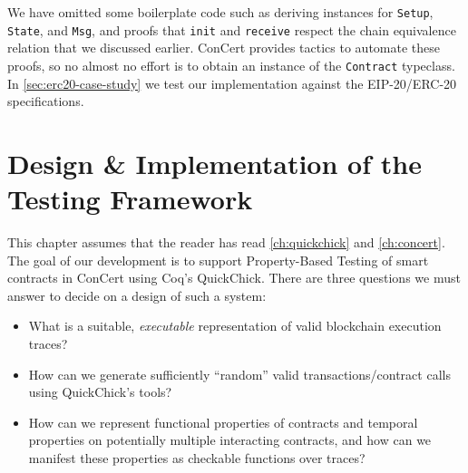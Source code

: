 \documentclass[twoside,11pt,openright]{report}
\newcommand{\pbt}{Property-Based Testing}
\newcommand{\cc}{ConCert}
\newcommand{\coq}[1]{\texttt{#1}}
\begin{document}
We have omitted some boilerplate code such as deriving \serializable{} instances for \coq{Setup}, \coq{State}, and \coq{Msg}, and proofs that \coq{init} and \coq{receive} respect the chain equivalence relation that we discussed earlier. \cc{} provides tactics to automate these proofs, so no almost no effort is to obtain an instance of the \coq{Contract} typeclass. In \autoref{sec:erc20-case-study} we test our implementation against the EIP-20/ERC-20 specifications.



\chapter{Design \& Implementation of the Testing Framework}
\label{ch:design-implementation}
This chapter assumes that the reader has read \autoref{ch:quickchick} and \ref{ch:concert}. The goal of our development is to support \pbt{} of smart contracts in ConCert using Coq's QuickChick. There are three questions we must answer to decide on a design of such a system:
\begin{itemize}
    \item What is a suitable, \textit{executable} representation of valid blockchain execution traces?
    \item How can we generate sufficiently ``random'' valid transactions/contract calls using QuickChick's tools?
    \item How can we represent functional properties of contracts and temporal properties on potentially multiple interacting contracts, and how can we manifest these properties as checkable functions over traces?
\end{itemize}
 
\end{document}
